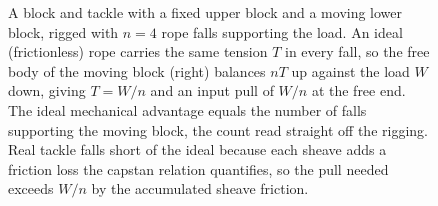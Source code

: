 \begin{figure}[htbp]
\caption[Block and tackle]{A block and tackle with a fixed upper block and a
moving lower block, rigged with $n=4$ rope falls supporting the load. An ideal
(frictionless) rope carries the same tension $T$ in every fall, so the free
body of the moving block (right) balances $nT$ up against the load $W$ down,
giving $T = W/n$ and an input pull of $W/n$ at the free end. The ideal
mechanical advantage equals the number of falls supporting the moving block,
the count read straight off the rigging. Real tackle falls short of the ideal
because each sheave adds a friction loss the capstan relation quantifies, so
the pull needed exceeds $W/n$ by the accumulated sheave friction.}
\label{fig:vol03ch02:block-tackle}
\end{figure}
